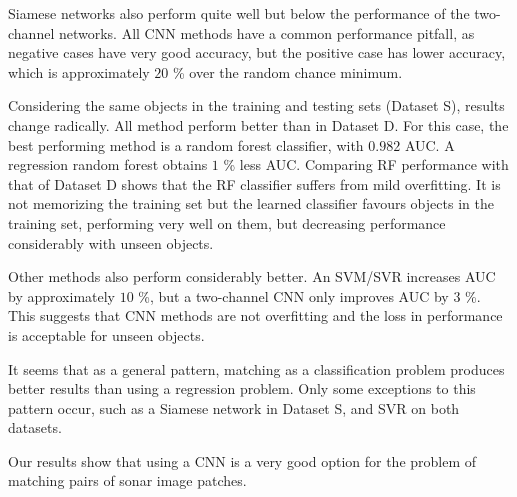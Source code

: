 Siamese networks also perform quite well but below the performance of the two-channel networks. All CNN methods have a common performance pitfall, as negative cases have very good accuracy, but the positive case has lower accuracy, which is approximately $20$ \% over the random chance minimum.

Considering the same objects in the training and testing sets (Dataset S), results change radically. All method perform better than in Dataset D. For this case, the best performing method is a random forest classifier, with $0.982$ AUC. A regression random forest obtains $1$ \% less AUC. Comparing RF performance with that of Dataset D shows that the RF classifier suffers from mild overfitting. It is not memorizing the training set but the learned classifier favours objects in the training set, performing very well on them, but decreasing performance considerably with unseen objects.

Other methods also perform considerably better. An SVM/SVR increases AUC by approximately $10$ \%, but a two-channel CNN only improves AUC by $3$ \%. This suggests that CNN methods are not overfitting and the loss in performance is acceptable for unseen objects.

It seems that as a general pattern, matching as a classification problem produces better results than using a regression problem. Only some exceptions to this pattern occur, such as a Siamese network in Dataset S, and SVR on both datasets.

Our results show that using a CNN is a very good option for the problem of matching pairs of sonar image patches.

\pgfplotsset{cycle list/Set1-6}


